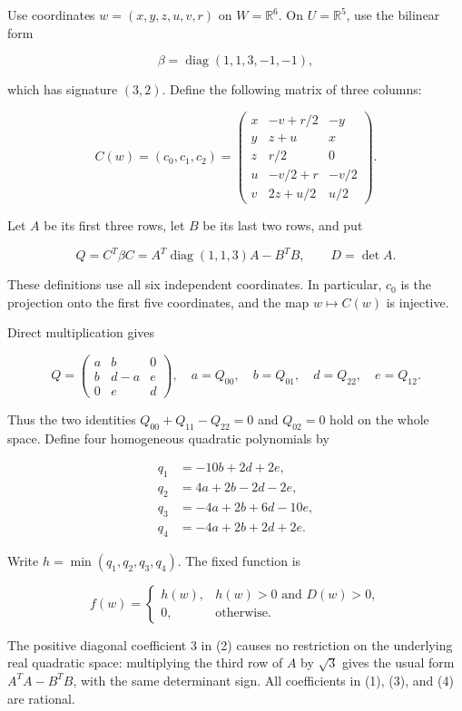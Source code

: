 \documentclass[11pt]{article}
\begin{document}
Use coordinates \(w=(x,y,z,u,v,r)\) on \(W=\mathbb R^6\). On
\(U=\mathbb R^5\), use the bilinear form

\[
\beta=\operatorname{diag}(1,1,3,-1,-1),
\]

which has signature \((3,2)\). Define the following matrix of three columns:

\[
C(w)=(c_0,c_1,c_2)=
\begin{pmatrix}
x&-v+r/2&-y\\
y&z+u&x\\
z&r/2&0\\
u&-v/2+r&-v/2\\
v&2z+u/2&u/2
\end{pmatrix}.
\tag{1}
\]

Let \(A\) be its first three rows, let \(B\) be its last two rows, and put

\[
Q=C^T\beta C=A^T\operatorname{diag}(1,1,3)A-B^TB,
\qquad D=\det A.
\tag{2}
\]

These definitions use all six independent coordinates. In particular,
\(c_0\) is the projection onto the first five coordinates, and the map
\(w\mapsto C(w)\) is injective.

Direct multiplication gives

\[
Q=\begin{pmatrix}a&b&0\\b&d-a&e\\0&e&d\end{pmatrix},
\quad a=Q_{00},\quad b=Q_{01},\quad d=Q_{22},\quad e=Q_{12}.
\tag{3}
\]

Thus the two identities \(Q_{00}+Q_{11}-Q_{22}=0\) and \(Q_{02}=0\)
hold on the whole space. Define four homogeneous quadratic polynomials by

\[
\begin{aligned}
q_1&=-10b+2d+2e,\\
q_2&=4a+2b-2d-2e,\\
q_3&=-4a+2b+6d-10e,\\
q_4&=-4a+2b+2d+2e.
\end{aligned}
\tag{4}
\]

Write \(h=\min(q_1,q_2,q_3,q_4)\). The fixed function is

\[
f(w)=
\begin{cases}
h(w),&h(w)>0\text{ and }D(w)>0,\\
0,&\text{otherwise}.
\end{cases}
\tag{5}
\]

The positive diagonal coefficient 3 in (2) causes no restriction on the
underlying real quadratic space: multiplying the third row of \(A\) by
\(\sqrt3\) gives the usual form \(A^TA-B^TB\), with the same determinant
sign. All coefficients in (1), (3), and (4) are rational.
\end{document}
